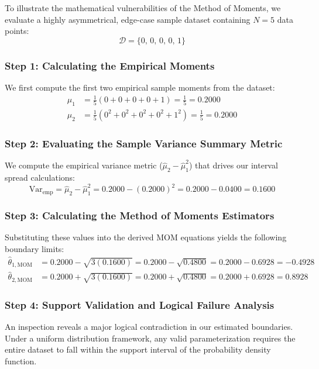 \documentclass{article}
\begin{document}
To illustrate the mathematical vulnerabilities of the Method of Moments, we evaluate a highly asymmetrical, edge-case sample dataset containing $N = 5$ data points:
\begin{equation}
\mathcal{D} = \{0, \, 0, \, 0, \, 0, \, 1\}
\end{equation}

\subsubsection{Step 1: Calculating the Empirical Moments}
We first compute the first two empirical sample moments from the dataset:
\begin{align}
\hat{\mu}_1 &= \frac{1}{5}(0 + 0 + 0 + 0 + 1) = \frac{1}{5} = \mathbf{0.2000} \\
\hat{\mu}_2 &= \frac{1}{5}(0^2 + 0^2 + 0^2 + 0^2 + 1^2) = \frac{1}{5} = \mathbf{0.2000}
\end{align}

\subsubsection{Step 2: Evaluating the Sample Variance Summary Metric}
We compute the empirical variance metric ($\hat{\mu}_2 - \hat{\mu}_1^2$) that drives our interval spread calculations:
\begin{equation}
\text{Var}_{\text{emp}} = \hat{\mu}_2 - \hat{\mu}_1^2 = 0.2000 - (0.2000)^2 = 0.2000 - 0.0400 = \mathbf{0.1600}
\end{equation}

\subsubsection{Step 3: Calculating the Method of Moments Estimators}
Substituting these values into the derived $\text{MOM}$ equations yields the following boundary limits:
\begin{align}
\hat{\theta}_{1,\text{MOM}} &= 0.2000 - \sqrt{3(0.1600)} = 0.2000 - \sqrt{0.4800} = 0.2000 - 0.6928 = \mathbf{-0.4928} \\
\hat{\theta}_{2,\text{MOM}} &= 0.2000 + \sqrt{3(0.1600)} = 0.2000 + \sqrt{0.4800} = 0.2000 + 0.6928 = \mathbf{0.8928}
\end{align}

\subsubsection{Step 4: Support Validation and Logical Failure Analysis}
An inspection reveals a major logical contradiction in our estimated boundaries. Under a uniform distribution framework, any valid parameterization requires the entire dataset to fall within the support interval of the probability density function. 
\end{document}
